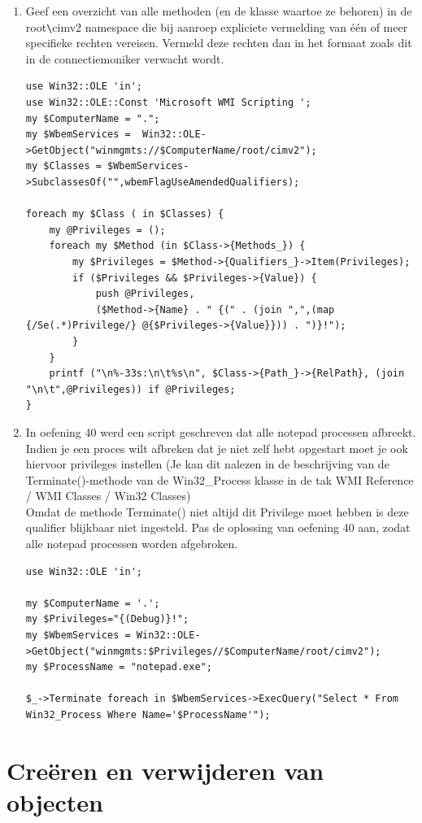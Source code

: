 \documentclass[11pt,a4paper]{report}
\begin{document}
\begin{enumerate}[resume]
	\item Geef een overzicht van alle methoden (en de klasse waartoe ze behoren) in de root\verb+\+cimv2 namespace die bij aanroep expliciete vermelding van één of meer specifieke rechten vereisen. Vermeld deze rechten dan in het formaat zoals dit in de connectiemoniker verwacht wordt.
	\begin{lstlisting}
use Win32::OLE 'in';
use Win32::OLE::Const 'Microsoft WMI Scripting ';
my $ComputerName = ".";
my $WbemServices =  Win32::OLE->GetObject("winmgmts://$ComputerName/root/cimv2");
my $Classes = $WbemServices->SubclassesOf("",wbemFlagUseAmendedQualifiers);

foreach my $Class ( in $Classes) {
	my @Privileges = ();
	foreach my $Method (in $Class->{Methods_}) {
		my $Privileges = $Method->{Qualifiers_}->Item(Privileges);
		if ($Privileges && $Privileges->{Value}) {
			push @Privileges,
			($Method->{Name} . " {(" . (join ",",(map {/Se(.*)Privilege/} @{$Privileges->{Value}})) . ")}!");
		}
	}
	printf ("\n%-33s:\n\t%s\n", $Class->{Path_}->{RelPath}, (join "\n\t",@Privileges)) if @Privileges;
}
	\end{lstlisting}
	\item In oefening 40 werd een script geschreven dat alle notepad processen afbreekt. Indien je een proces wilt afbreken dat je niet zelf hebt opgestart moet je ook hiervoor privileges instellen (Je kan dit nalezen in de beschrijving van de Terminate()-methode van de Win32\_Process klasse in de tak WMI Reference / WMI Classes / Win32 Classes)
	\\Omdat de methode Terminate() niet altijd dit Privilege moet hebben is deze qualifier blijkbaar niet ingesteld.
	Pas de oplossing van oefening 40 aan, zodat alle notepad processen worden afgebroken.
	\begin{lstlisting}
use Win32::OLE 'in';

my $ComputerName = '.';
my $Privileges="{(Debug)}!";
my $WbemServices = Win32::OLE->GetObject("winmgmts:$Privileges//$ComputerName/root/cimv2");
my $ProcessName = "notepad.exe";

$_->Terminate foreach in $WbemServices->ExecQuery("Select * From Win32_Process Where Name='$ProcessName'");
	\end{lstlisting}
\end{enumerate}
\section{Creëren en verwijderen van objecten}
\end{document}
